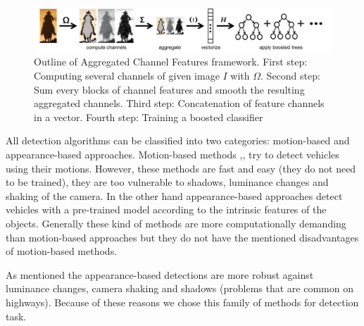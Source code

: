 \documentclass[conference]{IEEEtran}
\begin{document}
\begin{figure}
	\centering
	\includegraphics[width=\textwidth]{images/acfSteps.JPG}
	\caption{Outline of Aggregated Channel Features framework. First step: Computing several channels of given image $I$ with $\Omega$. Second step: Sum every blocks of channel features and smooth the resulting aggregated channels. Third step: Concatenation of feature channels in a vector. Fourth step: Training a boosted classifier \cite{dollar2014fast}}
	\label{ACFSteps}
\end{figure}

All detection algorithms can be classified into two categories: motion-based and appearance-based approaches. Motion-based methods \cite{sen2004robust},\cite{sirikuntamat2015vehicle},\cite{lu2014moving} try to detect vehicles using their motions. However, these methods are fast and easy (they do not need to be trained), they are too vulnerable to shadows, luminance changes and shaking of the camera. In the other hand appearance-based approaches detect vehicles with a pre-trained model according to the intrinsic features of the objects. Generally these kind of methods are more  computationally demanding than motion-based approaches but they do not have the mentioned disadvantages of motion-based methods.

As mentioned the appearance-based detections are more robust against luminance changes, camera shaking and shadows (problems that are common on highways). Because of these reasons we chose this family of methods for detection task. 
\end{document}
